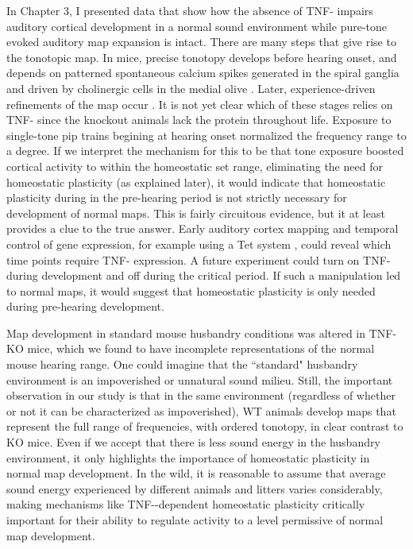 In Chapter 3, I presented data that show how the absence of TNF-\textalpha{} impairs auditory cortical development in a normal sound environment while pure-tone evoked auditory map expansion is intact. There are many steps that give rise to the tonotopic map. In mice, precise tonotopy develops before hearing onset, and depends on patterned spontaneous calcium spikes generated in the spiral ganglia and driven by cholinergic cells in the medial olive \cite{Elgoyhen1994, Cao2008, Clause2014}. Later, experience-driven refinements of the map occur \cite{DeVillers-Sidani2008, Han2007}. It is not yet clear which of these stages relies on TNF-\textalpha{} since the knockout animals lack the protein throughout life. Exposure to single-tone pip trains begining at hearing onset normalized the frequency range to a degree. If we interpret the mechanism for this to be that tone exposure boosted cortical activity to within the homeostatic set range, eliminating the need for homeostatic plasticity (as explained later), it would indicate that  homeostatic plasticity during in the pre-hearing period is not strictly necessary for development of normal maps. This is fairly circuitous evidence, but it at least provides a clue to the true answer. Early auditory cortex mapping and temporal control of gene expression, for example using a Tet system \cite{Gossen1995}, could reveal which time points require TNF-\textalpha{} expression. A future experiment could turn on TNF-\textalpha{} during development and off during the critical period. If such a manipulation led to normal maps, it would suggest that homeostatic plasticity is only needed during pre-hearing development.

Map development in standard mouse husbandry conditions was altered in TNF-\textalpha{} KO mice, which we found to have incomplete representations of the normal mouse hearing range. One could imagine that the ``standard" husbandry environment is an impoverished or unnatural sound milieu. Still, the important observation in our study is that in the same environment (regardless of whether or not it can be characterized as impoverished), WT animals develop maps that represent the full range of frequencies, with ordered tonotopy, in clear contrast to KO mice. Even if we accept that there is less sound energy in the husbandry environment, it only highlights the importance of homeostatic plasticity in normal map development. In the wild, it is reasonable to assume that average sound energy experienced by different animals and litters varies considerably, making mechanisms like TNF-\textalpha{}-dependent homeostatic plasticity critically important for their ability to regulate activity to a level permissive of normal map development.

